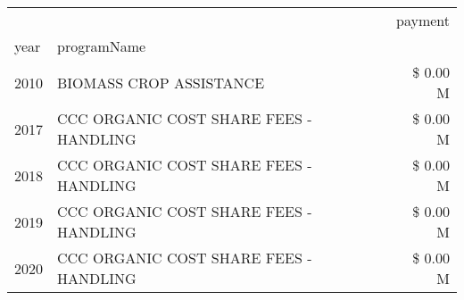 \begin{tabular}{llr}
\toprule
 &  & payment \\
year & programName &  \\
\midrule
2010 & BIOMASS CROP ASSISTANCE & \$ 0.00 M \\
\cline{1-3}
2017 & CCC ORGANIC COST SHARE FEES - HANDLING & \$ 0.00 M \\
\cline{1-3}
2018 & CCC ORGANIC COST SHARE FEES - HANDLING & \$ 0.00 M \\
\cline{1-3}
2019 & CCC ORGANIC COST SHARE FEES - HANDLING & \$ 0.00 M \\
\cline{1-3}
2020 & CCC ORGANIC COST SHARE FEES - HANDLING & \$ 0.00 M \\
\cline{1-3}
\bottomrule
\end{tabular}
